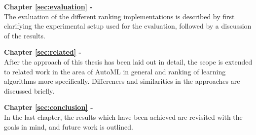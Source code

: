 \textbf{Chapter \ref{sec:evaluation} - } \\[0.2em]
The evaluation of the different ranking implementations is described by first clarifying the experimental setup used for the evaluation, followed by a discussion of the results.

\textbf{Chapter \ref{sec:related} - } \\[0.2em]
After the approach of this thesis has been laid out in detail, the scope is extended to related work in the area of AutoML in general and ranking of learning algorithms more specifically. Differences and similarities in the approaches are discussed briefly.

\textbf{Chapter \ref{sec:conclusion} - } \\[0.2em]
In the last chapter, the results which have been achieved are revisited with the goals in mind, and future work is outlined.

